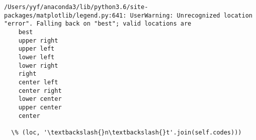 \documentclass[11pt]{article}
\begin{document}
    \begin{Verbatim}[commandchars=\\\{\}]
/Users/yyf/anaconda3/lib/python3.6/site-packages/matplotlib/legend.py:641: UserWarning: Unrecognized location "error". Falling back on "best"; valid locations are
	best
	upper right
	upper left
	lower left
	lower right
	right
	center left
	center right
	lower center
	upper center
	center

  \% (loc, '\textbackslash{}n\textbackslash{}t'.join(self.codes)))

    \end{Verbatim}

    \begin{center}
    \end{center}
    { \hspace*{\fill} \\}
    
\end{document}
